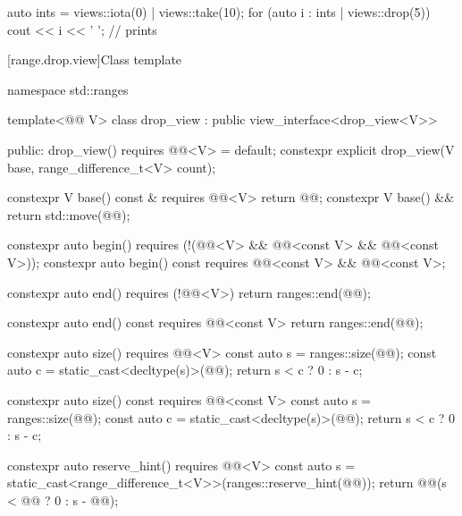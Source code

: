 \pnum
\begin{example}
\begin{codeblock}
auto ints = views::iota(0) | views::take(10);
for (auto i : ints | views::drop(5)) {
  cout << i << ' ';                             // prints 
}
\end{codeblock}
\end{example}

[range.drop.view]{Class template }

%
%
%
%
\begin{codeblock}
namespace std::ranges {
  template<@@ V>
  class drop_view : public view_interface<drop_view<V>> {
  public:
    drop_view() requires @@<V> = default;
    constexpr explicit drop_view(V base, range_difference_t<V> count);

    constexpr V base() const & requires @@<V> { return @@; }
    constexpr V base() && { return std::move(@@); }

    constexpr auto begin()
      requires (!(@@<V> &&
                  @@<const V> && @@<const V>));
    constexpr auto begin() const
      requires @@<const V> && @@<const V>;

    constexpr auto end() requires (!@@<V>)
    { return ranges::end(@@); }

    constexpr auto end() const requires @@<const V>
    { return ranges::end(@@); }

    constexpr auto size() requires @@<V> {
      const auto s = ranges::size(@@);
      const auto c = static_cast<decltype(s)>(@@);
      return s < c ? 0 : s - c;
    }

    constexpr auto size() const requires @@<const V> {
      const auto s = ranges::size(@@);
      const auto c = static_cast<decltype(s)>(@@);
      return s < c ? 0 : s - c;
    }

    constexpr auto reserve_hint() requires @@<V> {
      const auto s = static_cast<range_difference_t<V>>(ranges::reserve_hint(@@));
      return @@(s < @@ ? 0 : s - @@);
    }

}}
\end{codeblock}
